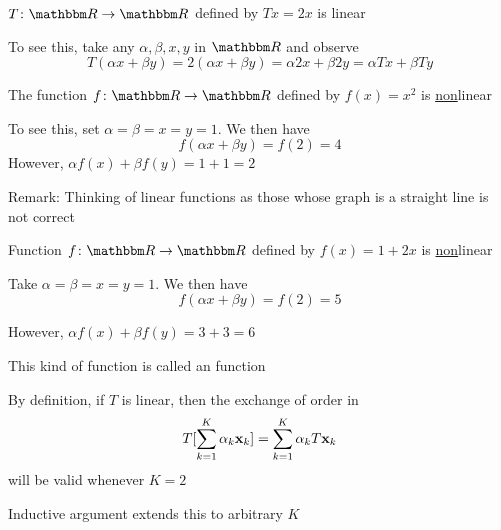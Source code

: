 \begin{frame}

    \vspace{2em}
   \Eg $T \colon \RR \to \RR$ defined by $Tx = 2x$ is linear 

    To see this, take any $\alpha, \beta, x, y$ in $\RR$ and observe 
    \begin{equation*}
      T(\alpha x + \beta y)
      = 2(\alpha x + \beta y)
      = \alpha 2 x + \beta 2 y
      = \alpha Tx + \beta Ty  
    \end{equation*}

    \vspace{.7em}
    \Eg The function $f \colon \RR \to \RR$ defined by $f(x) = x^2$ is
    \underline{non}linear
    
    To see this, set $\alpha = \beta = x = y = 1$. We then have
    $$f(\alpha x + \beta y) = f(2) = 4$$
    However, $\alpha f(x) + \beta f(y) = 1 + 1 = 2$
    
\end{frame}

\begin{frame}
    
    \vspace{2em}
    Remark: Thinking of linear functions as those whose graph is a straight
    line is not correct
    
    \vspace{.7em}
    \Eg    
    Function $f \colon \RR \to \RR$ defined by $f(x) = 1 + 2x$ is
    \underline{non}linear

    Take $\alpha = \beta = x = y = 1$. We then have
    $$f(\alpha x + \beta y) = f(2) = 5$$
    
    However, $\alpha f(x) + \beta f(y) = 3 + 3 = 6$
   
    \vspace{.7em}
    
    This kind of function is called an  function

\end{frame}

\begin{frame}

    \vspace{2em}
    By definition, if $T$ is linear, then the exchange of order in 
    \[T [ \sum_{k=1}^K \alpha_k {\mathbf x}_k ]
    = \sum_{k=1}^K \alpha_k T {\mathbf x}_k\]
    will be valid whenever $K=2$
    
    \vspace{.7em}
    Inductive argument extends this to arbitrary $K$
    
\end{frame}

